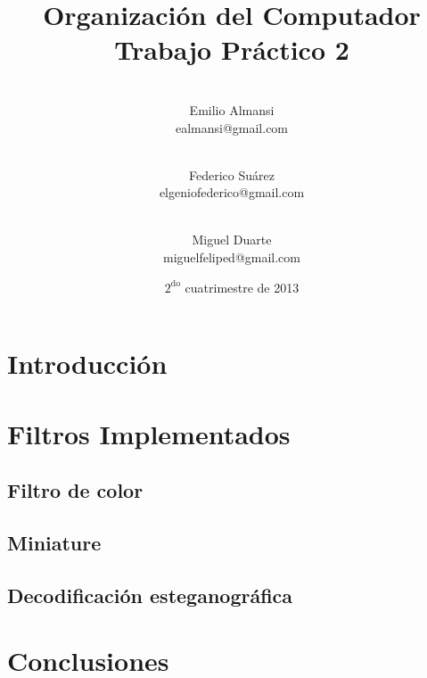 \documentclass[10pt, a4paper]{article}
\newcommand{\RNum}[1]{\uppercase\expandafter{\romannumeral #1\relax}}
\begin{document}
\setlength{\parindent}{25pt}

	
	\thispagestyle{empty}
	\title{%
	\huge{Organización del Computador \RNum{2}}\\
	\vspace{4mm}
	\large{Trabajo Práctico 2}
	}
	\date{\vspace{5mm}$2^{\mathrm{do}}$ cuatrimestre de 2013}

	\author{
		\\
		{\rm Emilio Almansi }\\
		\small{ealmansi@gmail.com}
		\and
		\\
		{\rm Federico Suárez}\\
		\small{elgeniofederico@gmail.com}
		\and
		\\
		{\rm Miguel Duarte}\\
		\small{miguelfeliped@gmail.com}
	} %
	\maketitle

	
	\vspace{10mm}
	\begin{abstract}
	\end{abstract}
	\vspace{10mm}


	\tableofcontents

	\newpage
	\section{Introducción}
		
	
	\section{Filtros Implementados}
		
	\newpage
	\subsection{Filtro de color}
		
	\newpage
	\subsection{Miniature}
		
	\newpage
	\subsection{Decodificación esteganográfica}
		
	\newpage
	\section{Conclusiones}
		

	
\end{document}
